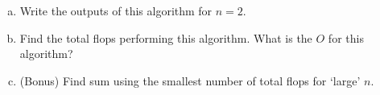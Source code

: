 \documentclass[12pt,letterpaper]{exam}
\begin{document}
\begin{questions}
\begin{enumerate}[(a)]
\item Write the outputs of this algorithm for $n= 2$.
\item Find the total flops performing this algorithm. What is the $O$ for this algorithm?
\item (Bonus) Find sum using the smallest number of total flops for `large' $n$. 
\end{enumerate}









\end{questions}
\end{document}
